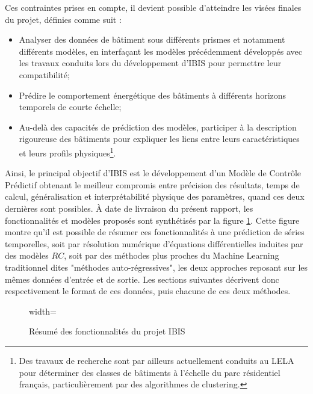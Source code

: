     Ces contraintes prises en compte, il devient possible d'atteindre les visées finales du projet, définies comme suit :
    \begin{itemize}
        \item Analyser des données de bâtiment sous différents prismes et notamment différents modèles, en interfaçant les modèles précédemment développés avec les travaux conduits lors du développement d'IBIS pour permettre leur compatibilité;
        \item Prédire le comportement énergétique des bâtiments à différents horizons temporels de courte échelle;
        \item Au-delà des capacités de prédiction des modèles, participer à la description rigoureuse des bâtiments pour expliquer les liens entre leurs caractéristiques et leurs profils physiques\footnote{Des travaux de recherche sont par ailleurs actuellement conduits au LELA pour déterminer des classes de bâtiments à l'échelle du parc résidentiel français, particulièrement par des algorithmes de clustering.}.
    \end{itemize}

    \begin{bluebox}
        Ainsi, le principal objectif d'IBIS est le développement d'un Modèle de Contrôle Prédictif obtenant le meilleur compromis entre précision des résultats, temps de calcul, généralisation et interprétabilité physique des paramètres, quand ces deux dernières sont possibles.
        À date de livraison du présent rapport, les fonctionnalités et modèles proposés sont synthétisés par la figure \ref{fig:IBIS_final_scheme}.
        Cette figure montre qu'il est possible de résumer ces fonctionnalités à une prédiction de séries temporelles, soit par résolution numérique d'équations différentielles induites par des modèles $RC$, soit par des méthodes plus proches du Machine Learning traditionnel dites "méthodes auto-régressives", les deux approches reposant sur les mêmes données d'entrée et de sortie.
        Les sections suivantes décrivent donc respectivement le format de ces données, puis chacune de ces deux méthodes.
    \end{bluebox}

    \begin{figure}[H]
        \centering
        \begin{adjustbox}{width=\textwidth}
        \fbox{}
        \end{adjustbox}
        \caption{Résumé des fonctionnalités du projet IBIS}\label{fig:IBIS_final_scheme}
    \end{figure}

